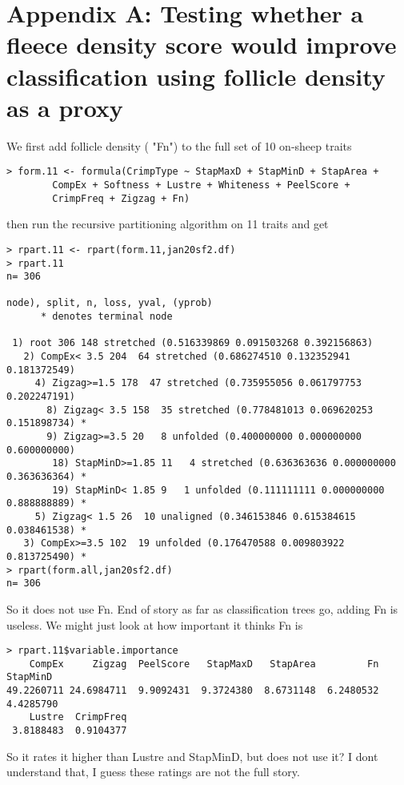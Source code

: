 \documentclass[titlepage]{article}  %
\begin{document}
 
\appendix
\section{Appendix A: Testing whether a fleece density score would improve classification using follicle density as a proxy}
 
	We first add follicle density ( "Fn") to the full set of 10 on-sheep traits 
\begin{verbatim}
> form.11 <- formula(CrimpType ~ StapMaxD + StapMinD + StapArea +
        CompEx + Softness + Lustre + Whiteness + PeelScore +
        CrimpFreq + Zigzag + Fn)
\end{verbatim}
 then run the recursive partitioning algorithm on 11 traits and get
\begin{verbatim}
> rpart.11 <- rpart(form.11,jan20sf2.df)
> rpart.11
n= 306 

node), split, n, loss, yval, (yprob)
      * denotes terminal node

 1) root 306 148 stretched (0.516339869 0.091503268 0.392156863)  
   2) CompEx< 3.5 204  64 stretched (0.686274510 0.132352941 0.181372549)  
     4) Zigzag>=1.5 178  47 stretched (0.735955056 0.061797753 0.202247191)  
       8) Zigzag< 3.5 158  35 stretched (0.778481013 0.069620253 0.151898734) *
       9) Zigzag>=3.5 20   8 unfolded (0.400000000 0.000000000 0.600000000)  
        18) StapMinD>=1.85 11   4 stretched (0.636363636 0.000000000 0.363636364) *
        19) StapMinD< 1.85 9   1 unfolded (0.111111111 0.000000000 0.888888889) *
     5) Zigzag< 1.5 26  10 unaligned (0.346153846 0.615384615 0.038461538) *
   3) CompEx>=3.5 102  19 unfolded (0.176470588 0.009803922 0.813725490) *
> rpart(form.all,jan20sf2.df)
n= 306 
\end{verbatim}
 So it does not use Fn. End of story as far as classification trees go, adding Fn is useless. 
We might just look at how important it thinks Fn is
\begin{verbatim}
> rpart.11$variable.importance
    CompEx     Zigzag  PeelScore   StapMaxD   StapArea         Fn   StapMinD 
49.2260711 24.6984711  9.9092431  9.3724380  8.6731148  6.2480532  4.4285790 
    Lustre  CrimpFreq 
 3.8188483  0.9104377 
\end{verbatim}
 So it rates it higher than Lustre and StapMinD, but does not use it?
 I dont understand that, I guess these ratings are not the full story.
\end{document}
